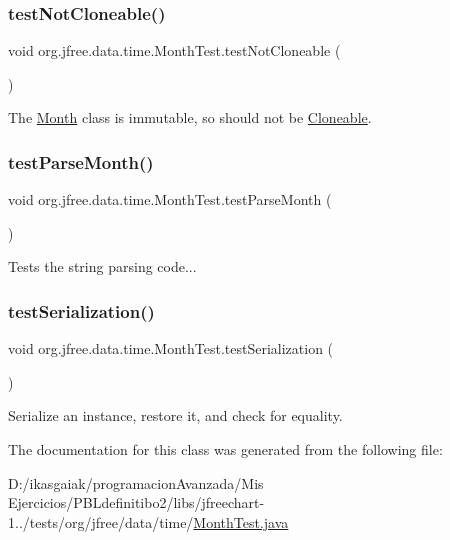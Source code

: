 \subsubsection{\texorpdfstring{test\+Not\+Cloneable()}{testNotCloneable()}}
{\footnotesize\ttfamily void org.\+jfree.\+data.\+time.\+Month\+Test.\+test\+Not\+Cloneable (\begin{DoxyParamCaption}{ }\end{DoxyParamCaption})}

The \mbox{\hyperlink{classorg_1_1jfree_1_1data_1_1time_1_1_month}{Month}} class is immutable, so should not be \mbox{\hyperlink{}{Cloneable}}. \mbox{\label{classorg_1_1jfree_1_1data_1_1time_1_1_month_test_a33267186c1ee7a054e3e65bb1326c34a}} 
\subsubsection{\texorpdfstring{test\+Parse\+Month()}{testParseMonth()}}
{\footnotesize\ttfamily void org.\+jfree.\+data.\+time.\+Month\+Test.\+test\+Parse\+Month (\begin{DoxyParamCaption}{ }\end{DoxyParamCaption})}

Tests the string parsing code... \mbox{\label{classorg_1_1jfree_1_1data_1_1time_1_1_month_test_ab689a669b83247accf2972e57e7a8c07}} 
\subsubsection{\texorpdfstring{test\+Serialization()}{testSerialization()}}
{\footnotesize\ttfamily void org.\+jfree.\+data.\+time.\+Month\+Test.\+test\+Serialization (\begin{DoxyParamCaption}{ }\end{DoxyParamCaption})}

Serialize an instance, restore it, and check for equality. 

The documentation for this class was generated from the following file\+:\begin{DoxyCompactItemize}
\item 
D\+:/ikasgaiak/programacion\+Avanzada/\+Mis Ejercicios/\+P\+B\+Ldefinitibo2/libs/jfreechart-\/1../tests/org/jfree/data/time/\mbox{\hyperlink{_month_test_8java}{Month\+Test.\+java}}\end{DoxyCompactItemize}
